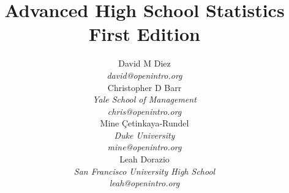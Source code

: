
\title{\huge Advanced High School Statistics\vspace{1.5mm} \\ \Large First Edition}
\author{David M Diez \\
\vspace{6mm}%
\small\emph{david@openintro.org} \\
Christopher D Barr \\
\small\emph{Yale School of Management} \\
\vspace{6mm}%
\small\emph{chris@openintro.org} \\
Mine \c{C}etinkaya-Rundel \\
\small\emph{Duke University} \\
\vspace{6mm}%
\small\emph{mine@openintro.org} \\
Leah Dorazio \\
\small\emph{San Francisco University High School} \\
\small\emph{leah@openintro.org}}
